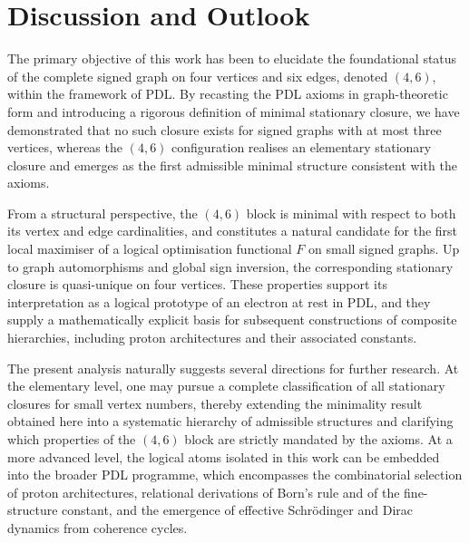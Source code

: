 \documentclass[11pt,a4paper]{article}
\theoremstyle{definition}
\begin{document}
\section{Discussion and Outlook}
\label{sec:discussion}

The primary objective of this work has been to elucidate the foundational status of the complete signed graph on four vertices and six edges, denoted $(4,6)$, within the framework of PDL. By recasting the PDL axioms in graph-theoretic form and introducing a rigorous definition of minimal stationary closure, we have demonstrated that no such closure exists for signed graphs with at most three vertices, whereas the $(4,6)$ configuration realises an elementary stationary closure and emerges as the first admissible minimal structure consistent with the axioms.\cite{PDL_Intro_2026,PDL_Main_2026}

From a structural perspective, the $(4,6)$ block is minimal with respect to both its vertex and edge cardinalities, and constitutes a natural candidate for the first local maximiser of a logical optimisation functional $F$ on small signed graphs.\cite{PDL_Main_2026,PDL_Global_Mapping_2026} Up to graph automorphisms and global sign inversion, the corresponding stationary closure is quasi-unique on four vertices. These properties support its interpretation as a logical prototype of an electron at rest in PDL, and they supply a mathematically explicit basis for subsequent constructions of composite hierarchies, including proton architectures and their associated constants.\cite{Combinatorial_Proton_v2_2026,Alpha_PDL_v2_2026,Schrodinger_PDL_v2_2026}

The present analysis naturally suggests several directions for further research. At the elementary level, one may pursue a complete classification of all stationary closures for small vertex numbers, thereby extending the minimality result obtained here into a systematic hierarchy of admissible structures and clarifying which properties of the $(4,6)$ block are strictly mandated by the axioms.\cite{PDL_Global_Mapping_2026} At a more advanced level, the logical atoms isolated in this work can be embedded into the broader PDL programme, which encompasses the combinatorial selection of proton architectures, relational derivations of Born’s rule and of the fine-structure constant, and the emergence of effective Schr\"odinger and Dirac dynamics from coherence cycles.\cite{Combinatorial_Proton_v2_2026,Born_Golden_v2_2026,Gleason_PDL_2026,Schrodinger_Sketch_v2_2026,Einstein_Dirac_PDL_2026}
\end{document}
